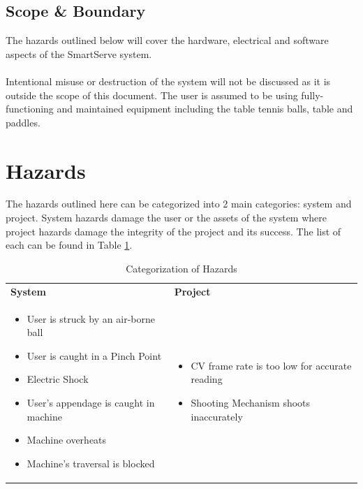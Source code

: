 \documentclass[11pt]{article}
\begin{document}
\subsection{Scope \& Boundary}
The hazards outlined below will cover the hardware, electrical and software aspects of the SmartServe system. \\ \\
Intentional misuse or destruction of the system will not be discussed as it is outside the scope of this document. The user is assumed to be using fully-functioning and maintained equipment including the table tennis balls, table and paddles. 

\section{Hazards}
The hazards outlined here can be categorized into 2 main categories: system and project. System hazards damage the user or the assets of the system where project hazards damage the integrity of the project and its success. The list of each can be found in Table \ref{table:hazard}. \\
\begin{table}[H]
\centering
\caption{Categorization of Hazards}
\label{table:hazard}
\begin{tabular}{ | >{\raggedright\arraybackslash}p{} | >{\raggedright\arraybackslash}p{} | }
\hline
\multicolumn{2}{|c|}{\textbf{Hazards}} \\ \hline
\textbf{System}   & \textbf{Project}   \\ \hline
\begin{itemize}
\item User is struck by an air-borne ball
\item User is caught in a Pinch Point
\item Electric Shock
\item User's appendage is caught in machine
\item Machine overheats
\item Machine's traversal is blocked
\end{itemize}
&
\begin{itemize}
\item CV frame rate is too low for accurate reading
\item Shooting Mechanism shoots inaccurately
\end{itemize}
\\ \hline
\end{tabular}
\end{table}
\end{document}
